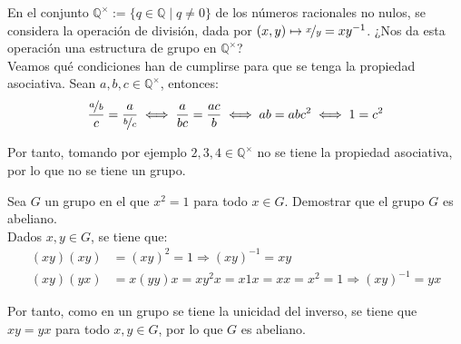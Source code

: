 \begin{ejercicio}\label{ej:2.5}
    En el conjunto $\mathbb{Q}^{\times} := \{q \in \mathbb{Q} \mid q \neq 0\}$ de los números racionales no nulos, se considera la operación de división, dada por $(x, y) \mapsto \nicefrac{x}{y} = xy^{-1}$. ¿Nos da esta operación una estructura de grupo en $\mathbb{Q}^{\times}$?\\

    Veamos qué condiciones han de cumplirse para que se tenga la propiedad asociativa. Sean $a, b, c \in \mathbb{Q}^{\times}$, entonces:
    \begin{equation*}
        \frac{\nicefrac{a}{b}}{c} =  
        \frac{a}{\nicefrac{b}{c}}
        \iff \frac{a}{bc} = \frac{ac}{b}
        \iff ab = abc^2
        \iff 1=c^2
    \end{equation*}

    Por tanto, tomando por ejemplo $2,3,4\in\mathbb{Q}^{\times}$ no se tiene la propiedad asociativa, por lo que no se tiene un grupo.
\end{ejercicio}

\begin{ejercicio}\label{ej:2.6}
    Sea $G$ un grupo en el que $x^2 = 1$ para todo $x \in G$. Demostrar que el grupo $G$ es abeliano.\\

    Dados $x, y \in G$, se tiene que:
    \begin{align*}
        (xy)(xy) &= (xy)^2 = 1 \Longrightarrow (xy)^{-1} = xy\\
        (xy)(yx) &= x(yy)x = xy^2x = x1x = xx = x^2 = 1 \Longrightarrow (xy)^{-1} = yx
    \end{align*}

    Por tanto, como en un grupo se tiene la unicidad del inverso, se tiene que $xy = yx$ para todo $x, y \in G$, por lo que $G$ es abeliano.
\end{ejercicio}

